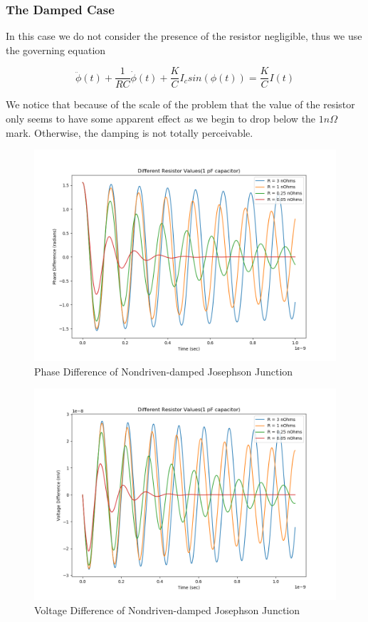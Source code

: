 \documentclass[12pt]{article}
\begin{document}
\subsubsection{The Damped Case}

In this case we do not consider the presence of the resistor negligible, thus we use the governing equation

\begin{equation}
\ddot{\phi}(t) + \dfrac{1}{RC} \dot{\phi}(t) + \dfrac{K}{C} I_c sin(\phi(t)) = \dfrac{K}{C} I(t)
\end{equation}

We notice that because of the scale of the problem that the value of the resistor only seems to have some apparent effect as we begin to drop below the $1 n\Omega$ mark.  Otherwise, the damping is not totally perceivable.

\begin{figure}
\caption{Phase Difference of Nondriven-damped Josephson Junction}
\begin{center}
\includegraphics[scale=0.60]{dud-jjres.png}
\end{center}
\end{figure}

\begin{figure}
\caption{Voltage Difference of Nondriven-damped Josephson Junction}
\begin{center}
\includegraphics[scale=0.60]{dud-jjresv.png}
\end{center}
\end{figure}
\end{document}
